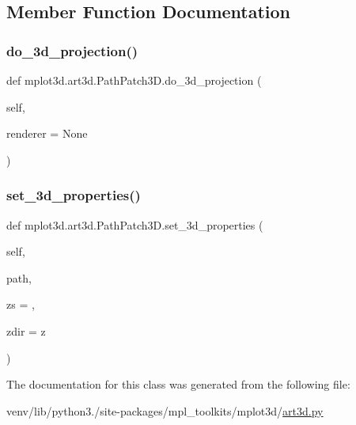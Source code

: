 \subsection{Member Function Documentation}
\mbox{\label{classmplot3d_1_1art3d_1_1PathPatch3D_af96de959b9d9a1328b785bb90bfb75a1}} 
\subsubsection{\texorpdfstring{do\+\_\+3d\+\_\+projection()}{do\_3d\_projection()}}
{\footnotesize\ttfamily def mplot3d.\+art3d.\+Path\+Patch3\+D.\+do\+\_\+3d\+\_\+projection (\begin{DoxyParamCaption}\item[{}]{self,  }\item[{}]{renderer = {\ttfamily None} }\end{DoxyParamCaption})}

\mbox{\label{classmplot3d_1_1art3d_1_1PathPatch3D_a492b46222fd64154840289c3b32a24cd}} 
\subsubsection{\texorpdfstring{set\+\_\+3d\+\_\+properties()}{set\_3d\_properties()}}
{\footnotesize\ttfamily def mplot3d.\+art3d.\+Path\+Patch3\+D.\+set\+\_\+3d\+\_\+properties (\begin{DoxyParamCaption}\item[{}]{self,  }\item[{}]{path,  }\item[{}]{zs = {},  }\item[{}]{zdir = {\ttfamily \textquotesingle{}z\textquotesingle{}} }\end{DoxyParamCaption})}



The documentation for this class was generated from the following file\+:\begin{DoxyCompactItemize}
\item 
venv/lib/python3./site-\/packages/mpl\+\_\+toolkits/mplot3d/\hyperlink{art3d_8py}{art3d.\+py}\end{DoxyCompactItemize}
